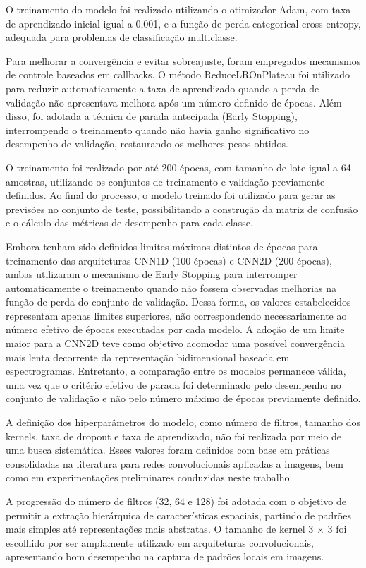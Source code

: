 O treinamento do modelo foi realizado utilizando o otimizador Adam, com taxa de aprendizado inicial igual a 0,001, e a função de perda 
categorical cross-entropy, adequada para problemas de classificação multiclasse.

Para melhorar a convergência e evitar sobreajuste, foram empregados mecanismos de controle baseados em callbacks. O método ReduceLROnPlateau 
foi utilizado para reduzir automaticamente a taxa de aprendizado quando a perda de validação não apresentava melhora após um número 
definido de épocas. Além disso, foi adotada a técnica de parada antecipada (Early Stopping), interrompendo o treinamento quando não havia 
ganho significativo no desempenho de validação, restaurando os melhores pesos obtidos.

O treinamento foi realizado por até 200 épocas, com tamanho de lote igual a 64 amostras, utilizando os conjuntos de treinamento e validação
previamente definidos. Ao final do processo, o modelo treinado foi utilizado para gerar as previsões no conjunto de teste, possibilitando a 
construção da matriz de confusão e o cálculo das métricas de desempenho para cada classe.

Embora tenham sido definidos limites máximos distintos de épocas para treinamento das arquiteturas CNN1D (100 épocas) e CNN2D (200 épocas), 
ambas utilizaram o mecanismo de Early Stopping para interromper automaticamente o treinamento quando não fossem observadas melhorias na função 
de perda do conjunto de validação. Dessa forma, os valores estabelecidos representam apenas limites superiores, não correspondendo necessariamente 
ao número efetivo de épocas executadas por cada modelo. A adoção de um limite maior para a CNN2D teve como objetivo acomodar uma possível 
convergência mais lenta decorrente da representação bidimensional baseada em espectrogramas. Entretanto, a comparação entre os modelos permanece 
válida, uma vez que o critério efetivo de parada foi determinado pelo desempenho no conjunto de validação e não pelo número máximo de épocas 
previamente definido.

A definição dos hiperparâmetros do modelo, como número de filtros, tamanho dos kernels, taxa de dropout e taxa de aprendizado, não foi realizada por 
meio de uma busca sistemática. Esses valores foram definidos com base em práticas consolidadas na literatura para redes convolucionais aplicadas a 
imagens, bem como em experimentações preliminares conduzidas neste trabalho.

A progressão do número de filtros (32, 64 e 128) foi adotada com o objetivo de permitir a extração hierárquica de características espaciais, partindo 
de padrões mais simples até representações mais abstratas. O tamanho de kernel 3 × 3 foi escolhido por ser amplamente utilizado em arquiteturas 
convolucionais, apresentando bom desempenho na captura de padrões locais em imagens.

